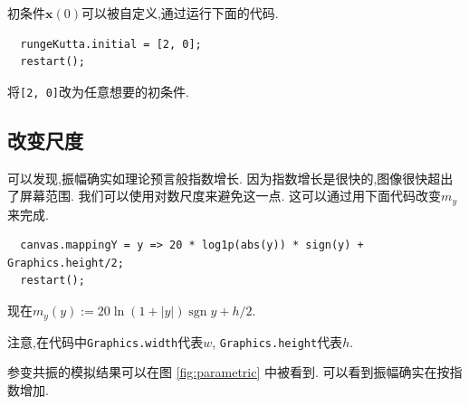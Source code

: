 \documentclass[12pt]{article}
\begin{document}
初条件$\mathbf x\left(0\right)$可以被自定义,通过运行下面的代码.

\begin{verbatim}
  rungeKutta.initial = [2, 0];
  restart();
\end{verbatim}

将\texttt{[2, 0]}改为任意想要的初条件.

\subsection{改变尺度}

可以发现,振幅确实如理论预言般指数增长.
因为指数增长是很快的,图像很快超出了屏幕范围.
我们可以使用对数尺度来避免这一点.
这可以通过用下面代码改变$m_y$来完成.

\begin{verbatim}
  canvas.mappingY = y => 20 * log1p(abs(y)) * sign(y) + Graphics.height/2;
  restart();
\end{verbatim}

现在$m_y\left(y\right):=20\ln\left(1+\left|y\right|\right)\operatorname{sgn}y+h/2$.

注意,在代码中\texttt{Graphics.width}代表$w$,
\texttt{Graphics.height}代表$h$.

参变共振的模拟结果可以在图 \ref{fig:parametric} 中被看到.
可以看到振幅确实在按指数增加.
\end{document}
